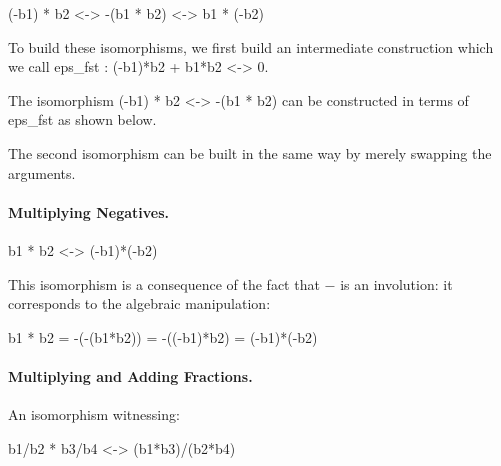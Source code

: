 \documentclass[preprint]{sigplanconf}
\begin{document}
{{(-b1) * b2 <-> -(b1 * b2) <-> b1 * (-b2)}}

To build these isomorphisms, we first build an intermediate
construction which we call {{eps_{fst} : (-b1)*b2 + b1*b2 <-> 0}}. 
\begin{center}
\end{center}

The isomorphism {{(-b1) * b2 <-> -(b1 * b2)}} can be constructed in
terms of {{eps_{fst} }} as shown below. 

\begin{center}
\end{center}  

The second isomorphism can be built in the same way by merely swapping
the arguments. 

\paragraph*{Multiplying Negatives.}

{{b1 * b2 <-> (-b1)*(-b2)}}

This isomorphism is a consequence of the fact that $-$ is an involution: it
corresponds to the algebraic manipulation:


{{b1 * b2 = -(-(b1*b2)) = -((-b1)*b2) = (-b1)*(-b2)}}

\paragraph*{Multiplying and Adding Fractions.}
An isomorphism witnessing:

{{b1/b2 * b3/b4 <-> (b1*b3)/(b2*b4)}}
\end{document}
